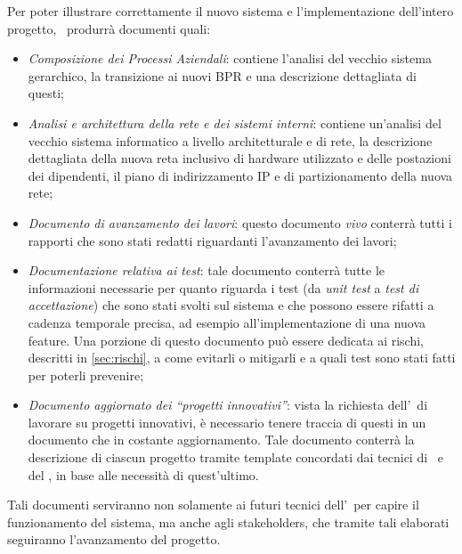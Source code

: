 	Per poter illustrare correttamente il nuovo sistema e l'implementazione dell'intero progetto, \azienda~produrrà documenti quali:
	\begin{itemize}[noitemsep]
		
		\item \textit{Composizione dei Processi Aziendali}: contiene l'analisi del vecchio sistema gerarchico, la transizione ai nuovi BPR e una descrizione dettagliata di questi;
		
		\item \textit{Analisi e architettura della rete e dei sistemi interni}: contiene un'analisi del vecchio sistema informatico a livello architetturale e di rete, la descrizione dettagliata della nuova reta inclusivo di hardware utilizzato e delle postazioni dei dipendenti, il piano di indirizzamento IP e di partizionamento della nuova rete;
		

		\item \textit{Documento di avanzamento dei lavori}: questo documento \textit{vivo} conterrà tutti i rapporti che sono stati redatti riguardanti l'avanzamento dei lavori;
		
		\item \textit{Documentazione relativa ai test}: tale documento conterrà tutte le informazioni necessarie per quanto riguarda i test (da \textit{unit test} a \textit{test di accettazione}) che sono stati svolti sul sistema e che possono essere rifatti a cadenza temporale precisa, ad esempio all'implementazione di una nuova feature.
		Una porzione di questo documento può essere dedicata ai rischi, descritti in \ref{sec:rischi}, a come evitarli o mitigarli e a quali test sono stati fatti per poterli prevenire;
		
		\item \textit{Documento aggiornato dei ``progetti innovativi''}: vista la richiesta dell'\istituto~di lavorare su progetti innovativi, è necessario tenere traccia di questi in un documento che in costante aggiornamento.
		Tale documento conterrà la descrizione di ciascun progetto tramite template concordati dai tecnici di \azienda~e del \proponente, in base alle necessità di quest'ultimo.
		
	\end{itemize}

	Tali documenti serviranno non solamente ai futuri tecnici dell'\istituto~per capire il funzionamento del sistema, ma anche agli stakeholders, che tramite tali elaborati seguiranno l'avanzamento del progetto.

